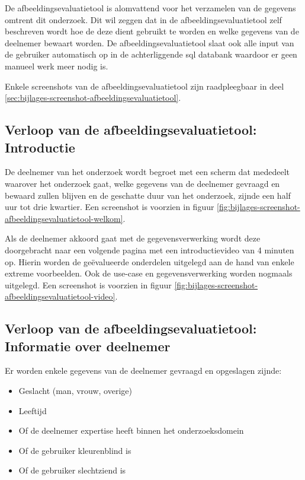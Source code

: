De \gls{afbeeldingsevaluatietool} is alomvattend voor het verzamelen van de gegevens omtrent dit onderzoek. Dit wil zeggen dat in de \gls{afbeeldingsevaluatietool} zelf beschreven wordt hoe de deze dient gebruikt te worden en welke gegevens van de deelnemer bewaart worden. De \gls{afbeeldingsevaluatietool} slaat ook alle input van de gebruiker automatisch op in de achterliggende \gls{sql} databank waardoor er geen manueel werk meer nodig is.

Enkele screenshots van de \gls{afbeeldingsevaluatietool} zijn raadpleegbaar in deel \ref{sec:bijlages-screenshot-afbeeldingsevaluatietool}.

\subsection{Verloop  van de afbeeldingsevaluatietool: Introductie}
\label{sec:onderzoek-evaluatietool-verloop-intro}

De deelnemer van het onderzoek wordt begroet met een scherm dat mededeelt waarover het onderzoek gaat, welke gegevens van de deelnemer gevraagd en bewaard zullen blijven en de geschatte duur van het onderzoek, zijnde een half uur tot drie kwartier. Een screenshot is voorzien in figuur \ref{fig:bijlages-screenshot-afbeeldingsevaluatietool-welkom}.

Als de deelnemer akkoord gaat met de gegevensverwerking wordt deze doorgebracht naar een volgende pagina met een introductievideo van 4 minuten op. Hierin worden de geëvalueerde onderdelen uitgelegd aan de hand van enkele extreme voorbeelden. Ook de \gls{use-case} en gegevensverwerking worden nogmaals uitgelegd. Een screenshot is voorzien in figuur \ref{fig:bijlages-screenshot-afbeeldingsevaluatietool-video}.

\subsection{Verloop  van de afbeeldingsevaluatietool: Informatie over deelnemer}
\label{sec:onderzoek-evaluatietool-verloop-info-participant}

Er worden enkele gegevens van de deelnemer gevraagd en opgeslagen zijnde: 

\begin{itemize}
	\item Geslacht (man, vrouw, overige)
	\item Leeftijd
	\item Of de deelnemer expertise heeft binnen het 
	onderzoeksdomein
	\item Of de gebruiker kleurenblind is
	\item Of de gebruiker slechtziend is
\end{itemize}

